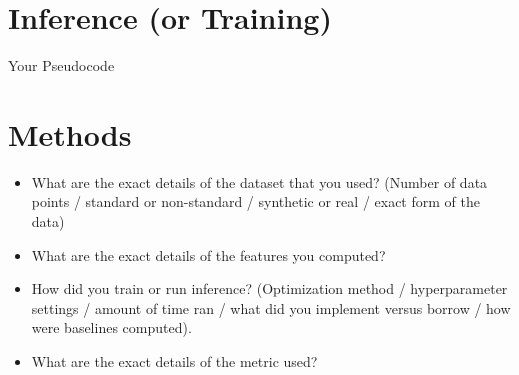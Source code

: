 \documentclass{article}
\begin{document}
\section{Inference (or Training)}

\begin{comment}
\begin{itemize}
\item How do you plan on training your parameters / inferring the
  states of your latent variables (MLE / MAP / Backprop / VI / EM / BP / ...)

\item What are the assumptions implicit in this technique? Is it an approximation or exact? If it is an approximation what bound does it optimize?

\item What is the explicit method / algorithm that you derive for learning these parameters?
\end{itemize}
\end{comment}



\begin{algorithm}
  \begin{algorithmic}
    \STATE{}
  \end{algorithmic}
  \caption{Your Pseudocode}
\end{algorithm}




\section{Methods}

\begin{itemize}
\item What are the exact details of the dataset that you used? (Number of data points / standard or non-standard / synthetic or real / exact form of the data)

\item What are the exact details of the features you computed?


\item How did you train or run inference? (Optimization method / hyperparameter settings / amount of time ran / what did you implement versus borrow / how were baselines computed).

\item What are the exact details of the metric used?
\end{itemize}
\end{document}
